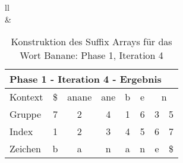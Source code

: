 \begin{table}[H]
\begin{adjustbox}{max width=\textwidth}
\begin{tabular}{ll}
\\
&
\\

\begin{tabular}{lccccccc}
\multicolumn{8}{l}{Phase 1 - Iteration 4 - Ergebnis}                                                                                                                                                              \\ \hline
\multicolumn{1}{l|}{Kontext} & \multicolumn{1}{c|}{\$} & \multicolumn{1}{c|}{\cellcolor[HTML]{\yellow}anane} & \multicolumn{1}{c|}{ane} & \multicolumn{1}{c|}{b} & \multicolumn{1}{c|}{e} & \multicolumn{2}{c}{n} \\
\multicolumn{1}{l|}{Gruppe}  & \multicolumn{1}{c|}{7}  & \multicolumn{1}{c|}{\cellcolor[HTML]{\yellow}2}     & \multicolumn{1}{c|}{4}   & \multicolumn{1}{c|}{1} & \multicolumn{1}{c|}{6} & 3         & 5          \\ \hline
\multicolumn{1}{l|}{Index}   & 1                       & 2                                                  & 3                        & 4                      & 5                      & 6         & 7          \\
\multicolumn{1}{l|}{Zeichen} & b                       & a                                                  & n                        & a                      & n                      & e         & \$        
\end{tabular}

\end{tabular}
\end{adjustbox}

\caption[Konstruktion des Suffix Arrays für das Wort Banane: Phase 1, Iteration 4]{Konstruktion des Suffix Arrays für das Wort Banane: Phase 1, Iteration 4}
\label{fig_banane_1_4} 
\end{table}
